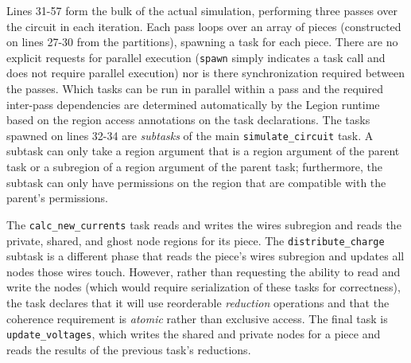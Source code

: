 Lines 31-57 form the bulk of the actual simulation, performing three
passes over the circuit in each iteration.  Each pass loops over an
array of pieces (constructed on lines 27-30 from the partitions),
spawning a task for each piece.  There are no explicit requests for
parallel execution ({\tt spawn} simply indicates a task call and does
not require parallel execution) nor is there synchronization required
between the passes.  Which tasks can be run in
parallel within a pass and the required inter-pass dependencies are
determined automatically by the Legion runtime based on the region
access annotations on the task declarations.  The tasks spawned on
lines 32-34 are {\em subtasks} of the main {\tt simulate\_circuit}
task. A subtask can only take a region argument that is a region
argument of the parent task or a subregion of a region argument of the
parent task; furthermore, the subtask can only have permissions on the
region that are compatible with the parent's permissions.  

The  {\tt calc\_new\_currents} task reads and writes the wires subregion 
and reads the private, shared, and ghost node regions for its piece.
The {\tt distribute\_charge} subtask is a different phase that reads the piece's 
wires subregion and updates all nodes those wires touch.  However,
rather than requesting the ability to read and write the nodes (which would
require serialization of these tasks for correctness), the task declares that
it will use reorderable {\em reduction} operations and that the coherence requirement
is {\em atomic} rather than exclusive access. The final task is 
{\tt update\_voltages}, which writes the shared and private nodes for a piece
and reads the results of the previous task's reductions.

  



